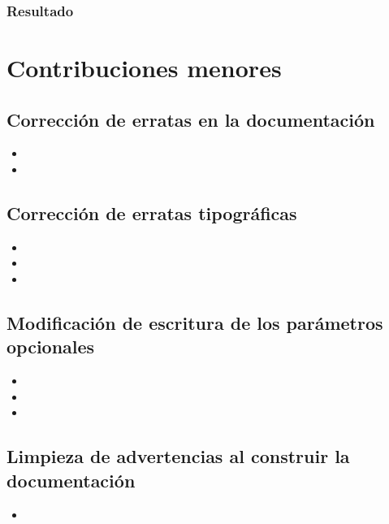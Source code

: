 \subsubsection{Resultado}

\section{Contribuciones menores} \label{sct:desarrollo:contribuciones_menores}

\subsection{Corrección de erratas en la documentación}

\begin{itemize}
    \item {}
    \item {}
\end{itemize}
\subsection{Corrección de erratas tipográficas}

\begin{itemize}
    \item {}
    \item {}
    \item {}
\end{itemize}

\subsection{Modificación de escritura de los parámetros opcionales}

\begin{itemize}
    \item {}
    \item {}
    \item {}
\end{itemize}

\subsection{Limpieza de advertencias al construir la documentación}

\begin{itemize}
    \item {}
\end{itemize}

